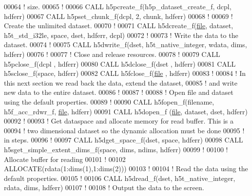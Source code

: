 \begin{DoxyCode}
00064   \textcolor{comment}{! size.}
00065   \textcolor{comment}{!}
00066   \textcolor{keyword}{CALL }h5pcreate\_f(h5p\_dataset\_create\_f, dcpl, hdferr)
00067   \textcolor{keyword}{CALL }h5pset\_chunk\_f(dcpl, 2, chunk, hdferr)
00068   \textcolor{comment}{!}
00069   \textcolor{comment}{! Create the unlimited dataset.}
00070   \textcolor{comment}{!}
00071   \textcolor{keyword}{CALL }h5dcreate\_f(\hyperlink{structfile}{file}, dataset, h5t\_std\_i32le, space, dset, hdferr, dcpl)
00072   \textcolor{comment}{!}
00073   \textcolor{comment}{! Write the data to the dataset.}
00074   \textcolor{comment}{!}
00075   \textcolor{keyword}{CALL }h5dwrite\_f(dset, h5t\_native\_integer, wdata, dims, hdferr)
00076   \textcolor{comment}{!}
00077   \textcolor{comment}{! Close and release resources.}
00078   \textcolor{comment}{!}
00079   \textcolor{keyword}{CALL }h5pclose\_f(dcpl , hdferr)
00080   \textcolor{keyword}{CALL }h5dclose\_f(dset , hdferr)
00081   \textcolor{keyword}{CALL }h5sclose\_f(space, hdferr)
00082   \textcolor{keyword}{CALL }h5fclose\_f(\hyperlink{structfile}{file} , hdferr)
00083   \textcolor{comment}{!}
00084   \textcolor{comment}{! In this next section we read back the data, extend the dataset,}
00085   \textcolor{comment}{! and write new data to the entire dataset.}
00086   \textcolor{comment}{!}
00087   \textcolor{comment}{!}
00088   \textcolor{comment}{! Open file and dataset using the default properties.}
00089   \textcolor{comment}{!}
00090   \textcolor{keyword}{CALL }h5fopen\_f(filename, h5f\_acc\_rdwr\_f, \hyperlink{structfile}{file}, hdferr)
00091   \textcolor{keyword}{CALL }h5dopen\_f (\hyperlink{structfile}{file}, dataset, dset, hdferr)
00092   \textcolor{comment}{!}
00093   \textcolor{comment}{! Get dataspace and allocate memory for read buffer.  This is a}
00094   \textcolor{comment}{! two dimensional dataset so the dynamic allocation must be done}
00095   \textcolor{comment}{! in steps.}
00096   \textcolor{comment}{!}
00097   \textcolor{keyword}{CALL }h5dget\_space\_f(dset, space, hdferr)
00098   \textcolor{keyword}{CALL }h5sget\_simple\_extent\_dims\_f(space, dims, ndims, hdferr)
00099   \textcolor{comment}{!}
00100   \textcolor{comment}{! Allocate buffer for reading}
00101   \textcolor{comment}{!}
00102   \textcolor{keyword}{ALLOCATE}(rdata(1:dims(1),1:dims(2)))
00103   \textcolor{comment}{!}
00104   \textcolor{comment}{! Read the data using the default properties.}
00105   \textcolor{comment}{!}
00106   \textcolor{keyword}{CALL }h5dread\_f(dset, h5t\_native\_integer, rdata, dims, hdferr)
00107   \textcolor{comment}{!}
00108   \textcolor{comment}{! Output the data to the screen.}

\end{DoxyCode}
